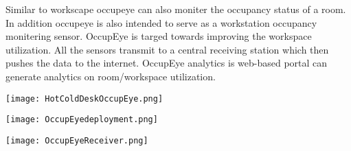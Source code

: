 Similar to workscape occupeye can also moniter the occupancy status of a room. In addition occupeye is also intended to serve as a workstation occupancy monitering sensor.
OccupEye is targed towards improving the workspace utilization.
All the sensors transmit to a central receiving station which then pushes the data to the internet. OccupEye analytics is web-based portal can generate analytics on room/workspace utilization.

\begin{center}
	
\texttt{[image: HotColdDeskOccupEye.png]}

\texttt{[image: OccupEyedeployment.png]}

\texttt{[image: OccupEyeReceiver.png]}
\end{center}